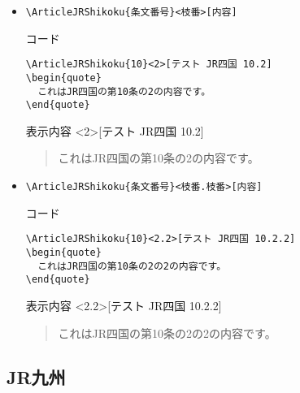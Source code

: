 \documentclass[oneside,10pt,a4paper]{jsarticle}
\begin{document}
\begin{itemize}
    \item \verb|\ArticleJRShikoku{条文番号}<枝番>[内容]|
      \begin{itembox}[l]{コード}
        {\footnotesize\begin{verbatim}
\ArticleJRShikoku{10}<2>[テスト JR四国 10.2]
\begin{quote}
  これはJR四国の第10条の2の内容です。
\end{quote}\end{verbatim}}
      \end{itembox}
      \begin{itembox}[l]{表示内容}
        <2>[テスト JR四国 10.2]
        \begin{quote}
          これはJR四国の第10条の2の内容です。
        \end{quote}
      \end{itembox}
    \item \verb|\ArticleJRShikoku{条文番号}<枝番.枝番>[内容]|
      \begin{itembox}[l]{コード}
        {\footnotesize\begin{verbatim}
\ArticleJRShikoku{10}<2.2>[テスト JR四国 10.2.2]
\begin{quote}
  これはJR四国の第10条の2の2の内容です。
\end{quote}\end{verbatim}}
      \end{itembox}
      \begin{itembox}[l]{表示内容}
        <2.2>[テスト JR四国 10.2.2]
        \begin{quote}
          これはJR四国の第10条の2の2の内容です。
        \end{quote}
      \end{itembox}
  \end{itemize}

  \newpage

  \subsection{JR九州}
\end{document}
